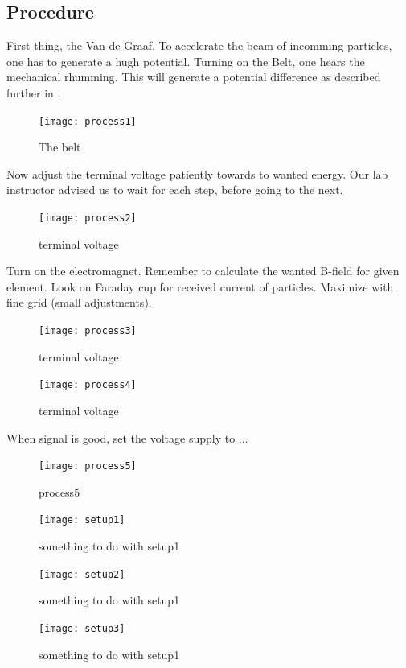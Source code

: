 \clearpage
\subsection{Procedure}
First thing, the Van-de-Graaf. To accelerate the beam of incomming particles,
one has to generate a hugh potential. Turning on the Belt, one hears the
mechanical rhumming. This will generate a potential difference as described
further in \cite[p.xx]{krane}.
\begin{figure}[h]
\centering
\texttt{[image: process1]}
\caption{The belt}
\label{fig_process1}
\end{figure}

Now adjust the terminal voltage patiently towards to wanted energy. Our lab
instructor advised us to wait for each step, before going to the next.
\begin{figure}[h]
\centering
\texttt{[image: process2]}
\caption{terminal voltage}
\label{fig_process2}
\end{figure}

Turn on the electromagnet. Remember to calculate the wanted B-field for given
element. Look on Faraday cup for received current of particles. Maximize with
fine grid (small adjustments).
\begin{figure}[h]
\centering
\texttt{[image: process3]}
\caption{terminal voltage}
\label{fig_process3}
\end{figure}

\begin{figure}[h]
\centering
\texttt{[image: process4]}
\caption{terminal voltage}
\label{fig_process4}
\end{figure}

When signal is good, set the voltage supply to ... 
\begin{figure}[h]
\centering
\texttt{[image: process5]}
\caption{process5}
\label{fig_process5}
\end{figure}






\begin{figure}[h!]
    \centering
    \texttt{[image: setup1]}
    \caption{something to do with setup1}
    \label{fig_setup1}
\end{figure}

\begin{figure}[h!]
    \centering
    \texttt{[image: setup2]}
    \caption{something to do with setup1}
    \label{fig_setup2}
\end{figure}

\begin{figure}[h!]
    \centering
    \texttt{[image: setup3]}
    \caption{something to do with setup1}
    \label{fig_setup3}
\end{figure}

